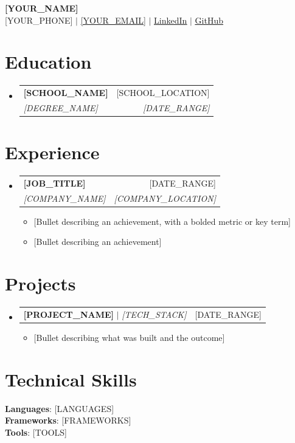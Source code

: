 \documentclass[letterpaper,11pt]{article}
\makeatletter
\newcommand{\resumeItem}[1]{
  \item\small{
    #1 \vspace{-2pt}
  }
}
\newcommand{\resumeSubheading}[4]{
  \vspace{-2pt}\item
    \begin{tabular*}{0.97\textwidth}[t]{l@{\extracolsep{\fill}}r}
      \textbf{#1} & #2 \\
      \textit{\small#3} & \textit{\small #4} \\
    \end{tabular*}\vspace{-7pt}
}
\newcommand{\resumeProjectHeading}[2]{
    \item
    \begin{tabular*}{0.97\textwidth}{l@{\extracolsep{\fill}}r}
      \small#1 & #2 \\
    \end{tabular*}\vspace{-7pt}
}
\newcommand{\resumeSubHeadingListStart}{\begin{itemize}[leftmargin=0.15in, label={}]}
\newcommand{\resumeSubHeadingListEnd}{\end{itemize}}
\newcommand{\resumeItemListStart}{\begin{itemize}}
\newcommand{\resumeItemListEnd}{\end{itemize}\vspace{-5pt}}
\makeatother
\begin{document}
\begin{center}
    \textbf{\Huge \scshape [YOUR_NAME]} \\ \vspace{1pt}
    \small [YOUR_PHONE] $|$ \href{mailto:[YOUR_EMAIL]}{\underline{[YOUR_EMAIL]}} $|$
    \href{[YOUR_LINKEDIN_URL]}{\underline{LinkedIn}} $|$
    \href{[YOUR_GITHUB_URL]}{\underline{GitHub}}
\end{center}


\section{Education}
  \resumeSubHeadingListStart
    \resumeSubheading
      {[SCHOOL_NAME]}{[SCHOOL_LOCATION]}
      {[DEGREE_NAME]}{[DATE_RANGE]}
  \resumeSubHeadingListEnd


\section{Experience}
  \resumeSubHeadingListStart

    \resumeSubheading
      {[JOB_TITLE]}{[DATE_RANGE]}
      {[COMPANY_NAME]}{[COMPANY_LOCATION]}
      \resumeItemListStart
        \resumeItem{[Bullet describing an achievement, with a bolded metric or key term]}
        \resumeItem{[Bullet describing an achievement]}
      \resumeItemListEnd

  \resumeSubHeadingListEnd


\section{Projects}
    \resumeSubHeadingListStart
      \resumeProjectHeading
          {\textbf{[PROJECT_NAME]} $|$ \emph{[TECH_STACK]}}{[DATE_RANGE]}
          \resumeItemListStart
            \resumeItem{[Bullet describing what was built and the outcome]}
          \resumeItemListEnd
    \resumeSubHeadingListEnd


\section{Technical Skills}
 \begin{itemize}[leftmargin=0.15in, label={}]
    \small{\item{
     \textbf{Languages}{: [LANGUAGES]} \\
     \textbf{Frameworks}{: [FRAMEWORKS]} \\
     \textbf{Tools}{: [TOOLS]} \\
    }}
 \end{itemize}


\end{document}
